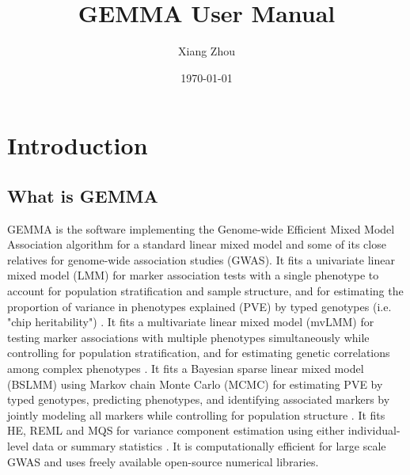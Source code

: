 \documentclass[11pt]{article}
\title{GEMMA User Manual}
\author{Xiang Zhou}
\date{\today}
\begin{document}
\maketitle

\tableofcontents

\newpage





\section{Introduction}

\subsection{What is GEMMA}
GEMMA is the software implementing the Genome-wide Efficient Mixed Model Association algorithm \cite{Zhou:2012} for a standard linear mixed model and some of its close relatives for genome-wide association studies (GWAS). It fits a univariate linear mixed model (LMM) for marker association tests with a single phenotype to account for population stratification and sample structure, and for estimating the proportion of variance in phenotypes explained (PVE) by typed genotypes (i.e. "chip heritability") \cite{Zhou:2012}.  It fits a multivariate linear mixed model (mvLMM) for testing marker associations with multiple phenotypes simultaneously while controlling for population stratification, and for estimating genetic correlations among complex phenotypes \cite{Zhou:2014}. It fits a Bayesian sparse linear mixed model (BSLMM) using Markov chain Monte Carlo (MCMC) for estimating PVE by typed genotypes, predicting phenotypes, and identifying associated markers by jointly modeling all markers while controlling for population structure \cite{Zhou:2013}. It fits HE, REML and MQS for variance component estimation using either individual-level data or summary statistics \cite{Zhou:2016}. It is computationally efficient for large scale GWAS and uses freely available open-source numerical libraries.
\end{document}
